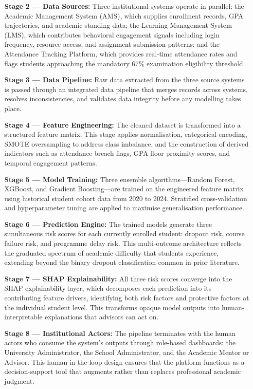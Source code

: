 \documentclass[12pt]{report}
\begin{document}
\textbf{Stage 2 --- Data Sources:} Three institutional systems operate
in parallel: the Academic Management System (AMS), which supplies
enrollment records, GPA trajectories, and academic standing data; the
Learning Management System (LMS), which contributes behavioral
engagement signals including login frequency, resource access, and
assignment submission patterns; and the Attendance Tracking Platform,
which provides real-time attendance rates and flags students approaching
the mandatory 67\% examination eligibility threshold.

\textbf{Stage 3 --- Data Pipeline:} Raw data extracted from the three
source systems is passed through an integrated data pipeline that merges
records across systems, resolves inconsistencies, and validates data
integrity before any modelling takes place.

\textbf{Stage 4 --- Feature Engineering:} The cleaned dataset is
transformed into a structured feature matrix. This stage applies
normalisation, categorical encoding, SMOTE oversampling to address
class imbalance, and the construction of derived indicators such as
attendance breach flags, GPA floor proximity scores, and temporal
engagement patterns.

\textbf{Stage 5 --- Model Training:} Three ensemble algorithms---Random
Forest, XGBoost, and Gradient Boosting---are trained on the engineered
feature matrix using historical student cohort data from 2020 to 2024.
Stratified cross-validation and hyperparameter tuning are applied to
maximise generalisation performance.

\textbf{Stage 6 --- Prediction Engine:} The trained models generate
three simultaneous risk scores for each currently enrolled student:
dropout risk, course failure risk, and programme delay risk. This
multi-outcome architecture reflects the graduated spectrum of academic
difficulty that students experience, extending beyond the binary dropout
classification common in prior literature.

\textbf{Stage 7 --- SHAP Explainability:} All three risk scores
converge into the SHAP explainability layer, which decomposes each
prediction into its contributing feature drivers, identifying both risk
factors and protective factors at the individual student level. This
transforms opaque model outputs into human-interpretable explanations
that advisors can act on.

\textbf{Stage 8 --- Institutional Actors:} The pipeline terminates
with the human actors who consume the system's outputs through
role-based dashboards: the University Administrator, the School
Administrator, and the Academic Mentor or Advisor. This
human-in-the-loop design ensures that the platform functions as a
decision-support tool that augments rather than replaces professional
academic judgment.
\end{document}

